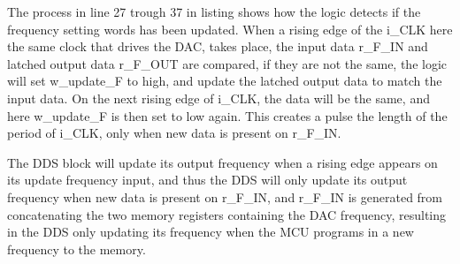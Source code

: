     The process in line 27 trough 37 in listing  shows how the logic detects if the frequency setting words has been updated. When a rising edge of the i\_CLK here the same clock that drives the DAC, takes place, the input data r\_F\_IN and latched output data r\_F\_OUT are compared, if they are not the same, the logic will set w\_update\_F to high, and update the latched output data to match the input data. On the next rising edge of i\_CLK, the data will be the same, and here w\_update\_F is then set to low again. This creates a pulse the length of the period of i\_CLK, only when new data is present on r\_F\_IN. 
    
    The DDS block will update its output frequency when a rising edge appears on its update frequency input, and thus the DDS will only update its output frequency when new data is present on r\_F\_IN, and r\_F\_IN is generated from concatenating the two memory registers containing the DAC frequency, resulting in the DDS only updating its frequency when the MCU programs in a new frequency to the memory.